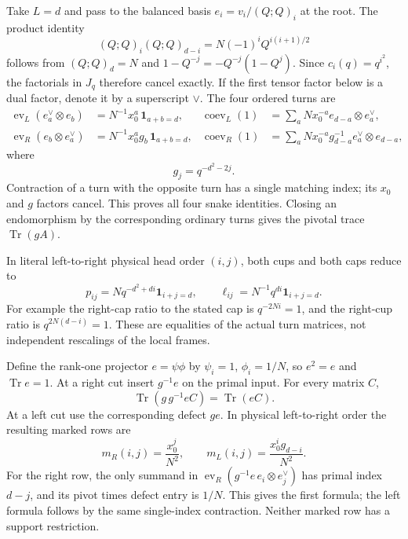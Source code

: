 Take \(L=d\) and pass to the balanced basis
\(e_i=v_i/(Q;Q)_i\) at the root. The product identity
\begin{equation}\label{de:factorial-cancellation}
 (Q;Q)_i(Q;Q)_{d-i}
       =N(-1)^iQ^{i(i+1)/2}
\end{equation}
follows from \((Q;Q)_d=N\) and
\(1-Q^{-j}=-Q^{-j}(1-Q^j)\).
Since \(c_i(q)=q^{i^2}\), the factorials in \(J_q\) therefore
cancel exactly. If the first tensor factor below is a dual factor,
denote it by a superscript \(\vee\). The four ordered turns are
\[
\begin{aligned}
 \operatorname{ev}_L(e_a^\vee\otimes e_b)
      &=N^{-1}x_0^a\,\mathbf1_{a+b=d},&
 \operatorname{coev}_L(1)
      &=\sum_a Nx_0^{-a}e_{d-a}\otimes e_a^\vee,\\
 \operatorname{ev}_R(e_b\otimes e_a^\vee)
      &=N^{-1}x_0^ag_b\,\mathbf1_{a+b=d},&
 \operatorname{coev}_R(1)
      &=\sum_a Nx_0^{-a}g_{d-a}^{-1}
                       e_a^\vee\otimes e_{d-a},
\end{aligned}
\]
where
\[
                       g_j=q^{-d^2-2j}.
\]
Contraction of a turn with the opposite turn has a single matching
index; its \(x_0\) and \(g\) factors cancel. This proves all four
snake identities. Closing an endomorphism by the corresponding
ordinary turns gives the pivotal trace \(\operatorname{Tr}(gA)\).

In literal left-to-right physical head order \((i,j)\), both cups
and both caps reduce to
\begin{equation}\label{de:root-turns}
 p_{ij}=Nq^{-d^2+di}\mathbf1_{i+j=d},
 \qquad
 \ell_{ij}=N^{-1}q^{di}\mathbf1_{i+j=d}.
\end{equation}
For example the right-cap ratio to the stated cap is
\(q^{-2Ni}=1\), and the right-cup ratio is
\(q^{2N(d-i)}=1\). These are equalities of the actual turn matrices,
not independent rescalings of the local frames.

Define the rank-one projector \(e=\psi\phi\) by
\(\psi_i=1\), \(\phi_i=1/N\), so \(e^2=e\) and
\(\operatorname{Tr}e=1\). At a right cut insert \(g^{-1}e\)
on the primal input. For every matrix \(C\),
\[
                 \operatorname{Tr}(g\,g^{-1}eC)
                           =\operatorname{Tr}(eC).
\]
At a left cut use the corresponding defect \(ge\). In physical
left-to-right order the resulting marked rows are
\begin{equation}\label{de:unrestricted-mark}
 m_R(i,j)=\frac{x_0^j}{N^2},\qquad
 m_L(i,j)=\frac{x_0^i g_{d-i}}{N^2}.
\end{equation}
For the right row, the only summand in
\(\operatorname{ev}_R(g^{-1}e\,e_i\otimes e_j^\vee)\)
has primal index \(d-j\), and its pivot times defect entry is
\(1/N\). This gives the first formula; the left formula follows
by the same single-index contraction. Neither marked row has a
support restriction.


